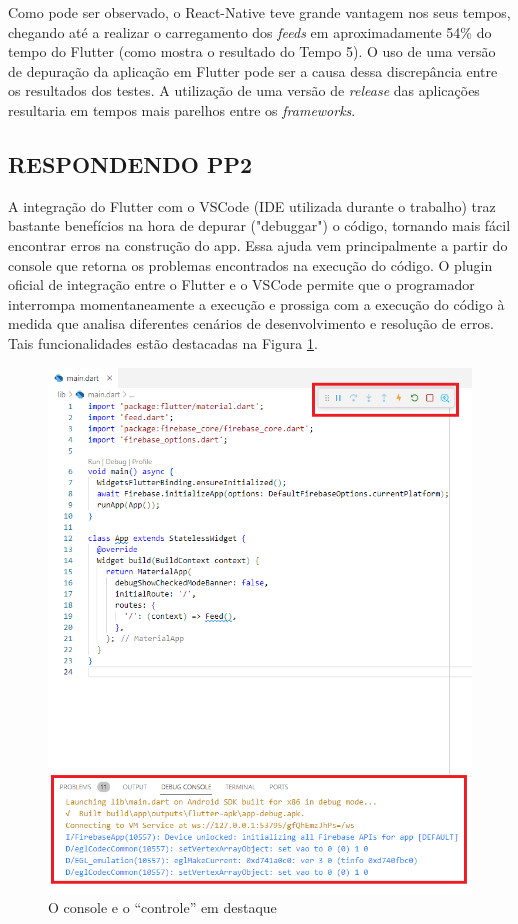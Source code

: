 \documentclass[12pt]{article}
\begin{document}
Como pode ser observado, o React-Native teve grande vantagem nos seus tempos, chegando até a realizar o carregamento dos \textit{feeds} em aproximadamente 54\% do tempo do Flutter (como mostra o resultado do Tempo 5). O uso de uma versão de depuração da aplicação em Flutter pode ser a causa dessa discrepância entre os resultados dos testes. A utilização de uma versão de \textit{release} das aplicações resultaria em tempos mais parelhos entre os \textit{frameworks}.

\subsection{RESPONDENDO PP2} \label{sec:pp2}

A integração do Flutter com o VSCode (IDE utilizada durante o trabalho) traz bastante benefícios na hora de depurar ("debuggar") o código, tornando mais fácil encontrar erros na construção do app. Essa ajuda vem principalmente a partir do console que retorna os problemas encontrados na execução do código. O plugin oficial de integração entre o Flutter e o VSCode permite que o programador interrompa momentaneamente a execução e prossiga com a execução do código à medida que analisa diferentes cenários de desenvolvimento e resolução de erros. Tais funcionalidades estão destacadas na Figura \ref{fig:debug}.

\begin{figure}[ht!]
\centering
\includegraphics[width=.8\textwidth]{imagens/debugFlutter.png}
\caption{O console e o “controle” em destaque}
\label{fig:debug}
\end{figure}
\end{document}
